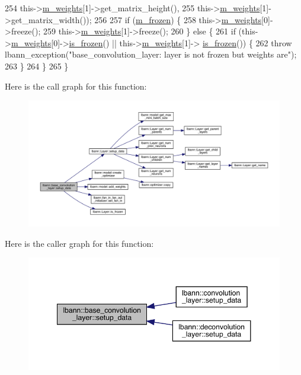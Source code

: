 \begin{DoxyCode}
254               this->\hyperlink{classlbann_1_1Layer_a7954e30fbf9100a6ba4b56d02767a469}{m\_weights}[1]->get\_matrix\_height(),
255               this->\hyperlink{classlbann_1_1Layer_a7954e30fbf9100a6ba4b56d02767a469}{m\_weights}[1]->get\_matrix\_width());
256 
257     \textcolor{keywordflow}{if} (\hyperlink{classlbann_1_1Layer_afdc60df9731a3ecdeeeb8175fa483676}{m\_frozen}) \{
258       this->\hyperlink{classlbann_1_1Layer_a7954e30fbf9100a6ba4b56d02767a469}{m\_weights}[0]->freeze();
259       this->\hyperlink{classlbann_1_1Layer_a7954e30fbf9100a6ba4b56d02767a469}{m\_weights}[1]->freeze();
260     \} \textcolor{keywordflow}{else} \{
261       \textcolor{keywordflow}{if} (this->\hyperlink{classlbann_1_1Layer_a7954e30fbf9100a6ba4b56d02767a469}{m\_weights}[0]->\hyperlink{classlbann_1_1Layer_af3c0f9f32eb631f4fdf34ad040ef8637}{is\_frozen}() || this->\hyperlink{classlbann_1_1Layer_a7954e30fbf9100a6ba4b56d02767a469}{m\_weights}[1]->
      \hyperlink{classlbann_1_1Layer_af3c0f9f32eb631f4fdf34ad040ef8637}{is\_frozen}()) \{
262         \textcolor{keywordflow}{throw} lbann\_exception(\textcolor{stringliteral}{"base\_convolution\_layer: layer is not frozen but weights are"});
263       \}
264     \}
265   \}
\end{DoxyCode}
Here is the call graph for this function\+:\nopagebreak
\begin{figure}[H]
\begin{center}
\leavevmode
\includegraphics[width=350pt]{classlbann_1_1base__convolution__layer_a9f850c1bdf4ae3cd986411d3cb3a524c_cgraph}
\end{center}
\end{figure}
Here is the caller graph for this function\+:\nopagebreak
\begin{figure}[H]
\begin{center}
\leavevmode
\includegraphics[width=348pt]{classlbann_1_1base__convolution__layer_a9f850c1bdf4ae3cd986411d3cb3a524c_icgraph}
\end{center}
\end{figure}
